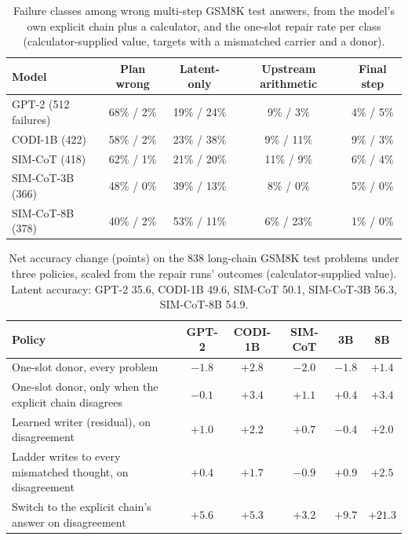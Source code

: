 \documentclass{article}
\begin{document}
\begin{table}[h]
\caption{Failure classes among wrong multi-step GSM8K test answers, from the model's own explicit chain plus a calculator, and the one-slot repair rate per class (calculator-supplied value, targets with a mismatched carrier and a donor).}
\label{tab:taxonomy}
\centering
\small
\begin{tabular}{lcccc}
\toprule
Model & Plan wrong & Latent-only & Upstream arithmetic & Final step \\
\midrule
GPT-2 (512 failures) & 68\% / 2\% & 19\% / 24\% & 9\% / 3\% & 4\% / 5\% \\
CODI-1B (422) & 58\% / 2\% & 23\% / 38\% & 9\% / 11\% & 9\% / 3\% \\
SIM-CoT (418) & 62\% / 1\% & 21\% / 20\% & 11\% / 9\% & 6\% / 4\% \\
SIM-CoT-3B (366) & 48\% / 0\% & 39\% / 13\% & 8\% / 0\% & 5\% / 0\% \\
SIM-CoT-8B (378) & 40\% / 2\% & 53\% / 11\% & 6\% / 23\% & 1\% / 0\% \\
\bottomrule
\end{tabular}
\end{table}

\begin{table}[h]
\caption{Net accuracy change (points) on the 838 long-chain GSM8K test problems under three policies, scaled from the repair runs' outcomes (calculator-supplied value). Latent accuracy: GPT-2 35.6, CODI-1B 49.6, SIM-CoT 50.1, SIM-CoT-3B 56.3, SIM-CoT-8B 54.9.}
\label{tab:policies}
\centering
\scriptsize
\setlength{\tabcolsep}{2pt}
\begin{tabular}{lccccc}
\toprule
Policy & GPT-2 & CODI-1B & SIM-CoT & 3B & 8B \\
\midrule
One-slot donor, every problem & $-1.8$ & $+2.8$ & $-2.0$ & $-1.8$ & $+1.4$ \\
One-slot donor, only when the explicit chain disagrees & $-0.1$ & $+3.4$ & $+1.1$ & $+0.4$ & $+3.4$ \\
Learned writer (residual), on disagreement & $+1.0$ & $+2.2$ & $+0.7$ & $-0.4$ & $+2.0$ \\
Ladder writes to every mismatched thought, on disagreement & $+0.4$ & $+1.7$ & $-0.9$ & $+0.9$ & $+2.5$ \\
Switch to the explicit chain's answer on disagreement & $+5.6$ & $+5.3$ & $+3.2$ & $+9.7$ & $+21.3$ \\
\bottomrule
\end{tabular}
\end{table}
\end{document}
